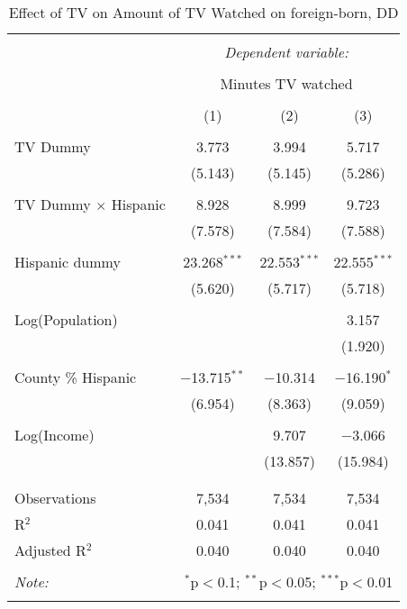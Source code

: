 
\begin{table}[!htbp] \centering 
  \caption{Effect of TV on Amount of TV Watched on foreign-born, DD} 
  \label{} 
\begin{tabular}{@{\extracolsep{-5pt}}lccc} 
\\[-1.8ex]\hline 
\hline \\[-1.8ex] 
 & \multicolumn{3}{c}{\textit{Dependent variable:}} \\ 
\cline{2-4} 
\\[-1.8ex] & \multicolumn{3}{c}{Minutes TV watched} \\ 
\\[-1.8ex] & (1) & (2) & (3)\\ 
\hline \\[-1.8ex] 
 TV Dummy & 3.773 & 3.994 & 5.717 \\ 
  & (5.143) & (5.145) & (5.286) \\ 
  & & & \\ 
 TV Dummy $\times$ Hispanic  & 8.928 & 8.999 & 9.723 \\ 
  & (7.578) & (7.584) & (7.588) \\ 
  & & & \\ 
 Hispanic dummy & 23.268$^{***}$ & 22.553$^{***}$ & 22.555$^{***}$ \\ 
  & (5.620) & (5.717) & (5.718) \\ 
  & & & \\ 
 Log(Population) &  &  & 3.157 \\ 
  &  &  & (1.920) \\ 
  & & & \\ 
 County \% Hispanic & $-$13.715$^{**}$ & $-$10.314 & $-$16.190$^{*}$ \\ 
  & (6.954) & (8.363) & (9.059) \\ 
  & & & \\ 
 Log(Income) &  & 9.707 & $-$3.066 \\ 
  &  & (13.857) & (15.984) \\ 
  & & & \\ 
\hline \\[-1.8ex] 
Observations & 7,534 & 7,534 & 7,534 \\ 
R$^{2}$ & 0.041 & 0.041 & 0.041 \\ 
Adjusted R$^{2}$ & 0.040 & 0.040 & 0.040 \\ 
\hline 
\hline \\[-1.8ex] 
\textit{Note:}  & \multicolumn{3}{r}{$^{*}$p$<$0.1; $^{**}$p$<$0.05; $^{***}$p$<$0.01} \\ 
 & \multicolumn{3}{r}{} \\ 
\end{tabular} 
\end{table} 
